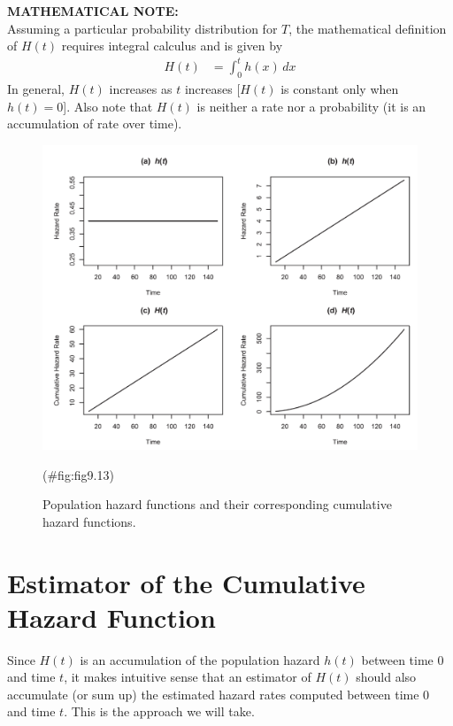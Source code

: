 \documentclass[
]{report}
\begin{document}
\large

\textbf{MATHEMATICAL NOTE:}\\
Assuming a particular probability distribution for \(T\), the mathematical definition of \(H(t)\) requires integral calculus and is given by
\begin{align}\label{9.16}
H(t) &= \int_{0}^{t} h(x)\,dx
\tag{9.16}
\end{align}
In general, \(H(t)\) increases as \(t\) increases {[}\(H(t)\) is constant only when \(h(t) = 0\){]}. Also note that \(H(t)\) is neither a rate nor a probability (it is an accumulation of rate over time).\\
\normalsize

\begin{figure}

{\centering \includegraphics[width=1\linewidth]{docs/Fig9_13} 

}

\caption{Population hazard functions and their corresponding cumulative hazard functions.}(\#fig:fig9.13)
\end{figure}

\section*{Estimator of the Cumulative Hazard Function}\label{estimator-of-the-cumulative-hazard-function}

Since \(H(t)\) is an accumulation of the population hazard \(h(t)\) between time 0 and time \(t\), it makes intuitive sense that an estimator of \(H(t)\) should also accumulate (or sum up) the estimated hazard rates computed between time 0 and time \(t\). This is the approach we will take.
\end{document}
